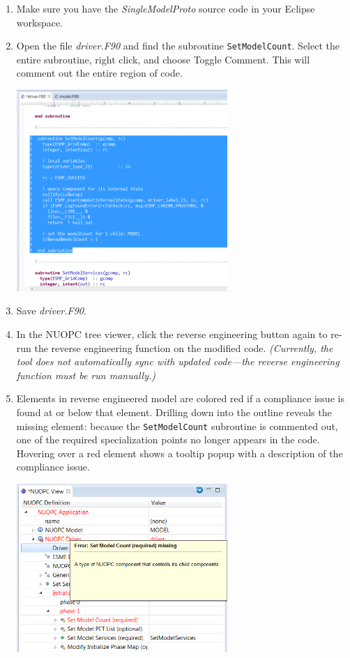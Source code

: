\documentclass[oneside,11pt]{memoir}
\begin{document}
\begin{enumerate}

\item Make sure you have the \emph{SingleModelProto} source code in your Eclipse workspace.

\item Open the file \emph{driver.F90} and find the subroutine \texttt{SetModelCount}.  Select the entire subroutine, right click, and choose Toggle Comment.  This will comment out the entire region of code.

\parbox{\linewidth}{\centering
  \includegraphics[width=8cm]{figs/verify_fig1.png}
}

\item Save \emph{driver.F90}.

\item In the NUOPC tree viewer, click the reverse engineering button again to re-run the reverse engineering function on the modified code.  \textit{(Currently, the tool does not automatically sync with updated code---the reverse engineering function must be run manually.)}  

\item Elements in reverse engineered model are colored red if a compliance issue is found at or below that element.  Drilling down into the outline reveals the missing element: because the \texttt{SetModelCount} subroutine is commented out, one of the required specialization points no longer appears in the code.  Hovering over a red element shows a tooltip popup with a description of the compliance issue.

\parbox{\linewidth}{\centering
  \includegraphics[width=8cm]{figs/verify_fig3.png}
}

\end{enumerate}
\end{document}
